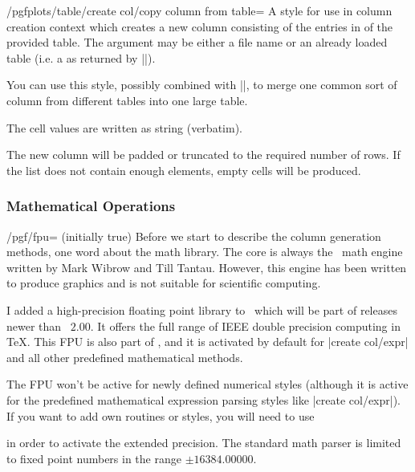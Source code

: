 \begin{stylekey}{/pgfplots/table/create col/copy column from table=}
	A style for use in column creation context which creates a new column consisting of the entries in  of the provided table. The argument may be either a file name or an already loaded table (i.e. a  as returned by |\pgfplotstableread|).

	You can use this style, possibly combined with |\pgfplotstablenew|, to merge one common sort of column from different tables into one large table.
	
	The cell values are written as string (verbatim).

	\noindent The new column will be padded or truncated to the required number of rows. If the list does not contain enough elements, empty cells will be produced.
\end{stylekey}


\subsubsection{Mathematical Operations}

\begin{key}{/pgf/fpu= (initially true)}
	Before we start to describe the column generation methods, one word about the math library. The core is always the \PGF\ math engine written by Mark Wibrow and Till Tantau. However, this engine has been written to produce graphics and is not suitable for scientific computing.
	
	I added a high-precision floating point library to \PGF\ which will be part of releases newer than \PGF\ $2.00$. It offers the full range of IEEE double precision computing in \TeX. This FPU is also part of \PGFPlotstable, and it is activated by default for |create col/expr| and all other predefined mathematical methods.

	The FPU won't be active for newly defined numerical styles (although it is active for the predefined mathematical expression parsing styles like |create col/expr|). If you want to add own routines or styles, you will need to use
\begin{codeexample}
\end{codeexample}
	\noindent in order to activate the extended precision. The standard math parser is limited to fixed point numbers in the range $\pm 16384.00000$.
\end{key}

